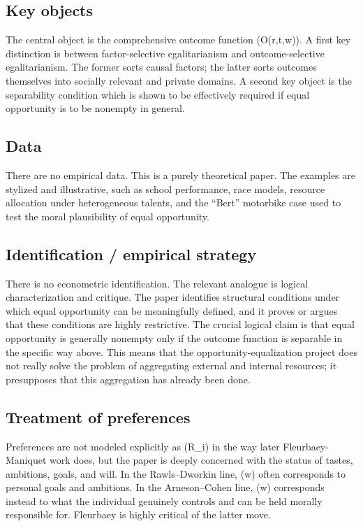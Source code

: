 \documentclass[11pt,a4paper]{article}
\begin{document}
\subsection*{Key objects}
The central object is the comprehensive outcome function (O(r,t,w)). A first key distinction is between factor-selective egalitarianism and outcome-selective egalitarianism. The former sorts causal factors; the latter sorts outcomes themselves into socially relevant and private domains. A second key object is the separability condition which is shown to be effectively required if equal opportunity is to be nonempty in general.

\subsection*{Data}
There are no empirical data. This is a purely theoretical paper. The examples are stylized and illustrative, such as school performance, race models, resource allocation under heterogeneous talents, and the “Bert” motorbike case used to test the moral plausibility of equal opportunity.

\subsection*{Identification / empirical strategy}
There is no econometric identification. The relevant analogue is logical characterization and critique. The paper identifies structural conditions under which equal opportunity can be meaningfully defined, and it proves or argues that these conditions are highly restrictive. The crucial logical claim is that equal opportunity is generally nonempty only if the outcome function is separable in the specific way above. This means that the opportunity-equalization project does not really solve the problem of aggregating external and internal resources; it presupposes that this aggregation has already been done.

\subsection*{Treatment of preferences}
Preferences are not modeled explicitly as (R\_i) in the way later Fleurbaey-Maniquet work does, but the paper is deeply concerned with the status of tastes, ambitions, goals, and will. In the Rawls–Dworkin line, (w) often corresponds to personal goals and ambitions. In the Arneson–Cohen line, (w) corresponds instead to what the individual genuinely controls and can be held morally responsible for. Fleurbaey is highly critical of the latter move.
\end{document}
